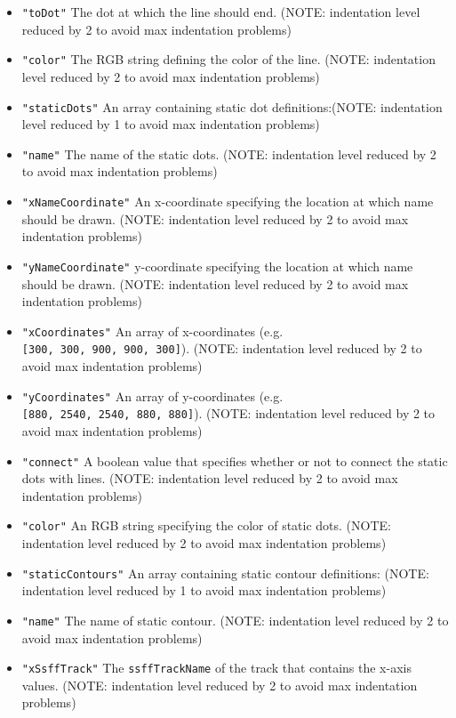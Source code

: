 \documentclass[]{book}
\begin{document}
\begin{itemize}
\begin{itemize}
\begin{itemize}
\begin{itemize}
      \item
        \texttt{"toDot"} The dot at which the line should end. (NOTE: indentation level reduced by 2 to avoid max indentation problems)
      \item
        \texttt{"color"} The RGB string defining the color of the line. (NOTE: indentation level reduced by 2 to avoid max indentation problems)
      \item
        \texttt{"staticDots"} An array containing static dot definitions:(NOTE: indentation level reduced by 1 to avoid max indentation problems)
      \item
        \texttt{"name"} The name of the static dots. (NOTE: indentation level reduced by 2 to avoid max indentation problems)
      \item
        \texttt{"xNameCoordinate"} An x-coordinate specifying the location at which name should be drawn. (NOTE: indentation level reduced by 2 to avoid max indentation problems)
      \item
        \texttt{"yNameCoordinate"} y-coordinate specifying the location at which name should be drawn. (NOTE: indentation level reduced by 2 to avoid max indentation problems)
      \item
        \texttt{"xCoordinates"} An array of x-coordinates (e.g. \texttt{{[}300,~300,~900,~900,~300{]}}). (NOTE: indentation level reduced by 2 to avoid max indentation problems)
      \item
        \texttt{"yCoordinates"} An array of y-coordinates (e.g. \texttt{{[}880,~2540,~2540,~880,~880{]}}). (NOTE: indentation level reduced by 2 to avoid max indentation problems)
      \item
        \texttt{"connect"} A boolean value that specifies whether or not to connect the static dots with lines. (NOTE: indentation level reduced by 2 to avoid max indentation problems)
      \item
        \texttt{"color"} An RGB string specifying the color of static dots. (NOTE: indentation level reduced by 2 to avoid max indentation problems)
      \item
        \texttt{"staticContours"} An array containing static contour definitions: (NOTE: indentation level reduced by 1 to avoid max indentation problems)
      \item
        \texttt{"name"} The name of static contour. (NOTE: indentation level reduced by 2 to avoid max indentation problems)
      \item
        \texttt{"xSsffTrack"} The \texttt{ssffTrackName} of the track that contains the x-axis values. (NOTE: indentation level reduced by 2 to avoid max indentation problems)

\end{itemize}
\end{itemize}
\end{itemize}
\end{itemize}
\end{document}
